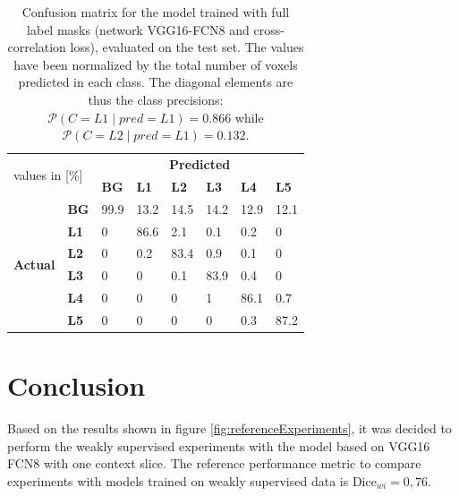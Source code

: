 \begin{table}
 
\begin{tabular}{cl|llllll}
    \toprule
    \multicolumn{2}{l|}{\multirow{2}{*}{values in {[}\%{]}}} & \multicolumn{6}{c}{\textbf{Predicted}}                                            \\
    \multicolumn{2}{l|}{}                                    & \textbf{BG} & \textbf{L1} & \textbf{L2} & \textbf{L3} & \textbf{L4} & \textbf{L5} \\ \hline
    \multirow{6}{*}{\textbf{Actual}}      & \textbf{BG}      & 99.9        & 13.2        & 14.5        & 14.2        & 12.9        & 12.1        \\
     & \textbf{L1} & 0 & 86.6 & 2.1  & 0.1  & 0.2  & 0    \\
     & \textbf{L2} & 0 & 0.2  & 83.4 & 0.9  & 0.1  & 0    \\
     & \textbf{L3} & 0 & 0    & 0.1  & 83.9 & 0.4  & 0    \\
     & \textbf{L4} & 0 & 0    & 0    & 1    & 86.1 & 0.7  \\
     & \textbf{L5} & 0 & 0    & 0    & 0    & 0.3  & 87.2 \\ \bottomrule
    \end{tabular}

    \caption{Confusion matrix for the model trained with full label masks (network VGG16-FCN8 and cross-correlation loss), evaluated on the test set.
    The values have been normalized by the total number of voxels predicted in each class.
    The diagonal elements are thus the class precisions: $\mathcal{P}(C = L1 \mid pred = L1) = 0.866$ while $\mathcal{P}(C = L2 \mid pred = L1) = 0.132$.
    \label{tab:full_confusionMatrix}
    }
\end{table}

\section{Conclusion}
\par{
    Based on the results shown in figure \ref{fig:referenceExperiments}, it was decided to perform the weakly supervised experiments with the model based on VGG16 FCN8 with one context slice.
    The reference performance metric to compare experiments with models trained on weakly supervised data is $\text{Dice}_{wi}=0,76$.
}


